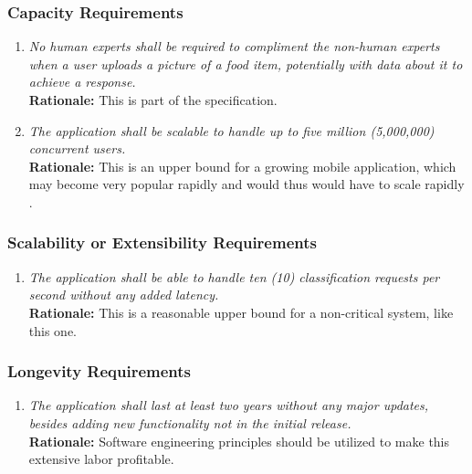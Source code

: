 \documentclass[]{article}
\begin{document}
\subsubsection{Capacity Requirements}
\label{ssub:capacity_requirements}
\begin{enumerate}[{PR-C}1. ]
	\item \textit{No human experts shall be required to compliment the non-human experts when a user uploads a picture of a food item, potentially with data about it to achieve a response.} \\ \textbf{Rationale:} This is part of the specification.
	\item \textit{The application shall be scalable to handle up to five million (5,000,000) concurrent users.} \\ \textbf{Rationale:} This is an upper bound for a growing mobile application, which may become very popular rapidly and would thus would have to scale rapidly \cite{Zeba}.
\end{enumerate}

\subsubsection{Scalability or Extensibility Requirements}
\label{ssub:scalability_or_extensibility_requirements}
\begin{enumerate}[{PR-SE}1. ]
    \item \textit{The application shall be able to handle ten (10) classification requests per second without any added latency.} \\ \textbf{Rationale:} This is a reasonable upper bound for a non-critical system, like this one.
\end{enumerate}

\subsubsection{Longevity Requirements}
\label{ssub:longevity_requirements}
\begin{enumerate}[{PR-L}1. ]
	\item \textit{The application shall last at least two years without any major updates, besides adding new functionality not in the initial release.} \\ \textbf{Rationale:} Software engineering principles should be utilized to make this extensive labor profitable.
\end{enumerate}
\end{document}
